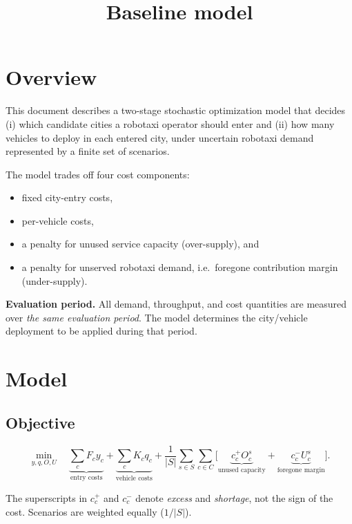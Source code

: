 \documentclass[10pt,a4paper]{article}
\title{\textbf{Baseline model}\\[2pt]}
\begin{document}
\maketitle
\vspace{-12mm}

\section{Overview}

This document describes a two-stage stochastic optimization model that decides
(i) which candidate cities a robotaxi operator should enter and
(ii) how many vehicles to deploy in each entered city,
under uncertain robotaxi demand represented by a finite set of scenarios.

The model trades off four cost components:
\begin{itemize}[leftmargin=*,itemsep=1pt]
  \item fixed city-entry costs,
  \item per-vehicle costs,
  \item a penalty for unused service capacity (over-supply), and
  \item a penalty for unserved robotaxi demand, i.e.\ foregone contribution margin (under-supply).
\end{itemize}

\textbf{Evaluation period.} All demand, throughput, and cost quantities are measured
over \emph{the same evaluation period}. The model determines the city/vehicle
deployment to be applied during that period.

\section{Model}

\subsection{Objective}

\[
\min_{y,q,O,U}\quad
\underbrace{\sum_{c} F_c y_c}_{\text{entry costs}}
+\underbrace{\sum_{c} K_c q_c}_{\text{vehicle costs}}
+\frac{1}{|S|}\sum_{s\in S}\sum_{c\in C}\Big[
\underbrace{c_c^{+}O_c^{s}}_{\text{unused capacity}}
+\underbrace{c_c^{-}U_c^{s}}_{\text{foregone margin}}
\Big].
\]

The superscripts in $c_c^{+}$ and $c_c^{-}$ denote \emph{excess} and \emph{shortage},
not the sign of the cost. Scenarios are weighted equally ($1/|S|$).
\end{document}
